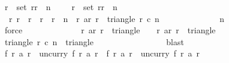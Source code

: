 \begin{isabellebody}
\ {\isacharbackquoteopen}r{}\ {\isasymin}\ set\ {\isacharbrackleft}r{}{\isachardot}{\isachardot}{\isacharless}{\isacharparenleft}r{}\ {\isacharplus}\ n\ {\isacharminus}\ {}{\isacharparenright}\ {\isacharplus}\ {}{\isacharbrackright}{\isacharbackquoteclose}\ {\isacharbackquoteopen}r{}\ {\isasymin}\ set\ {\isacharbrackleft}r{}{\isachardot}{\isachardot}{\isacharless}{\isacharparenleft}r{}\ {\isacharplus}\ n\ {\isacharminus}\ {}{\isacharparenright}\ {\isacharplus}\ {}{\isacharbrackright}{\isacharbackquoteclose}\isanewline
\ \ \ \ \ \ \ \ \ \ \ \ \isamarkupfalse%
\ {\isacharbackquoteopen}{\isasymforall}\ r{\isachardot}\ r{}\ {\isasymle}\ r\ {\isasymand}\ r\ {\isacharless}\ r{}\ {\isacharplus}\ n\ {\isasymlongrightarrow}\ {\isacharparenleft}r{\isacharcomma}\ ar\ r{\isacharparenright}\ {\isasymin}\ triangle\ r{}\ c{}\ n{\isacharbackquoteclose}\isanewline
\ \ \ \ \ \ \ \ \ \ \ \ \isamarkupfalse%
\ {\isacharbackquoteopen}n\ {\isasymge}\ {}{}{}{}{\isacharbackquoteclose}\isanewline
\ \ \ \ \ \ \ \ \ \ \ \ \isamarkupfalse%
\ force{\isacharplus}\isanewline
\isanewline
\ \ \ \ \ \ \ \ \ \ \isamarkupfalse%
\ \isamarkupfalse%
\ {\isachardoublequoteopen}{\isacharparenleft}r{}{\isacharcomma}\ ar\ r{}{\isacharparenright}\ {\isasymin}\ triangle\ {}\ {}\ {}{}{}{}{\isachardoublequoteclose}\ {\isachardoublequoteopen}{\isacharparenleft}r{}{\isacharcomma}\ ar\ r{}{\isacharparenright}\ {\isasymin}\ triangle\ {}\ {}\ {}{}{}{}{\isachardoublequoteclose}\isanewline
\ \ \ \ \ \ \ \ \ \ \ \ \isamarkupfalse%
\ {\isacartoucheopen}triangle\ r{}\ c{}\ n\ {\isasymsubseteq}\ triangle\ {}\ {}\ {}{}{}{}{\isacartoucheclose}\isanewline
\ \ \ \ \ \ \ \ \ \ \ \ \isamarkupfalse%
\ blast{\isacharplus}\isanewline
\isanewline
\ \ \ \ \ \ \ \ \ \ \isamarkupfalse%
\isanewline
\isanewline
\ \ \ \ \ \ \ \ \ \ \isamarkupfalse%
\ {\isachardoublequoteopen}f\ r{}\ {\isacharparenleft}a\ r{}{\isacharparenright}\ {\isacharequal}\ {\isacharparenleft}uncurry\ f{\isacharparenright}\ {\isacharparenleft}r{}{\isacharcomma}\ a\ r{}{\isacharparenright}{\isachardoublequoteclose}\ \ {\isachardoublequoteopen}f\ r{}\ {\isacharparenleft}a\ r{}{\isacharparenright}\ {\isacharequal}\ {\isacharparenleft}uncurry\ f{\isacharparenright}\ {\isacharparenleft}r{}{\isacharcomma}\ a\ r{}{\isacharparenright}{\isachardoublequoteclose}\isanewline

\end{isabellebody}
